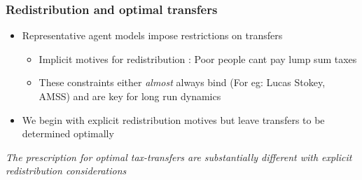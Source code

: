 \documentclass{beamer}
\begin{document}
 \begin{frame}
 \frametitle{Redistribution and optimal transfers}
 \begin{itemize}
  \item Representative agent models impose restrictions on transfers
  \begin{itemize}
 \item Implicit motives for redistribution :  Poor people cant pay lump sum taxes
  \item These constraints either \emph{almost} always bind (For eg: Lucas Stokey, AMSS) and are key for long run dynamics
  \end{itemize}
\item We begin with explicit redistribution motives but leave transfers to be determined optimally
 \end{itemize}

 \vspace{4mm}
 \color{red}\emph{The prescription for optimal tax-transfers are substantially different with explicit redistribution considerations}
 \end{frame}
 
\end{document}
